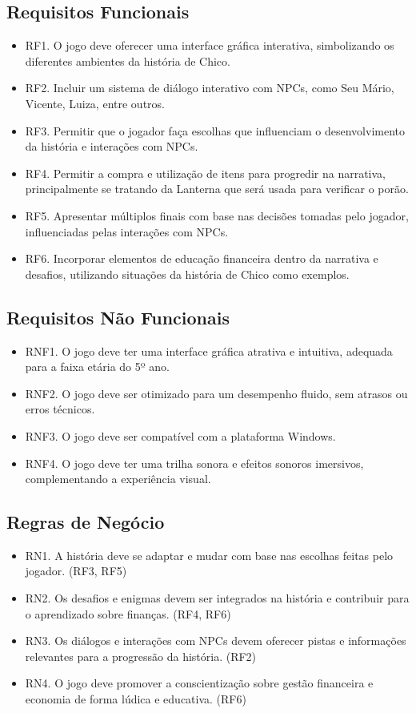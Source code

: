 \subsection*{Requisitos Funcionais}
\begin{itemize}
	\item RF1. O jogo deve oferecer uma interface gráfica interativa, simbolizando os diferentes ambientes da história de Chico.
	\item RF2. Incluir um sistema de diálogo interativo com NPCs, como Seu Mário, Vicente, Luiza, entre outros.
	\item RF3. Permitir que o jogador faça escolhas que influenciam o desenvolvimento da história e interações com NPCs.
	\item RF4. Permitir a compra e utilização de itens para progredir na narrativa, principalmente se tratando da Lanterna que será usada para verificar o porão.
	\item RF5. Apresentar múltiplos finais com base nas decisões tomadas pelo jogador, influenciadas pelas interações com NPCs.
	\item RF6. Incorporar elementos de educação financeira dentro da narrativa e desafios, utilizando situações da história de Chico como exemplos.
\end{itemize}

\subsection*{Requisitos Não Funcionais}
\begin{itemize}
	\item RNF1. O jogo deve ter uma interface gráfica atrativa e intuitiva, adequada para a faixa etária do 5º ano.
	\item RNF2. O jogo deve ser otimizado para um desempenho fluido, sem atrasos ou erros técnicos.
	\item RNF3. O jogo deve ser compatível com a plataforma Windows.
	\item RNF4. O jogo deve ter uma trilha sonora e efeitos sonoros imersivos, complementando a experiência visual.
\end{itemize}

\subsection*{Regras de Negócio}
\begin{itemize}
	\item RN1. A história deve se adaptar e mudar com base nas escolhas feitas pelo jogador. (RF3, RF5)
	\item RN2. Os desafios e enigmas devem ser integrados na história e contribuir para o aprendizado sobre finanças. (RF4, RF6)
	\item RN3. Os diálogos e interações com NPCs devem oferecer pistas e informações relevantes para a progressão da história. (RF2)
	\item RN4. O jogo deve promover a conscientização sobre gestão financeira e economia de forma lúdica e educativa. (RF6)
\end{itemize}

